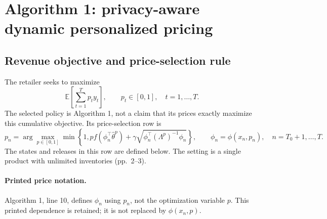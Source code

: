 \documentclass{article}
\begin{document}
\section*{Algorithm 1: privacy-aware dynamic personalized pricing}

\subsection*{Revenue objective and price-selection rule}
The retailer seeks to maximize
\[
\mathbb E\!\left[\sum_{t=1}^{T}p_ty_t\right],
\qquad p_t\in[0,1],\quad t=1,\ldots,T.
\]
The selected policy is Algorithm 1, not a claim that its prices exactly maximize this cumulative objective. Its price-selection row is
\[
p_n=\arg\max_{p\in[0,1]}\min\left\{1,
 p f\!\left(\phi_n^{\top}\widehat\theta^{p}\right)
 +\gamma\sqrt{\phi_n^{\top}(\Lambda^{p})^{-1}\phi_n}\right\},
\qquad \phi_n=\phi(x_n,p_n),
\quad n=T_0+1,\ldots,T.
\]
The states and releases in this row are defined below. The setting is a single product with unlimited inventories (pp.~2--3).

\paragraph{Printed price notation.}
Algorithm 1, line 10, defines $\phi_n$ using $p_n$, not the optimization variable $p$. This printed dependence is retained; it is not replaced by $\phi(x_n,p)$.
\end{document}
